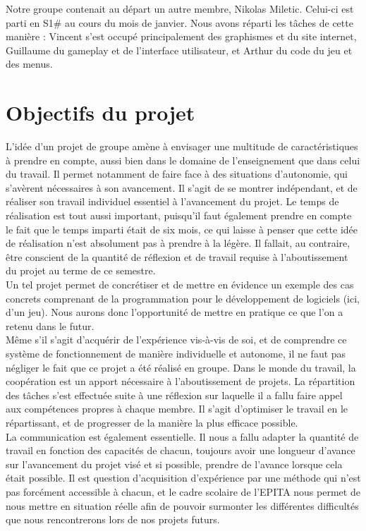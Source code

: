 \documentclass[12pt, titlepage]{article}
\begin{document}
\begin{spacing}{1.5}
Notre groupe contenait au départ un autre membre, Nikolas Miletic. Celui-ci est parti en S1\# au cours du mois de janvier. Nous avons réparti les tâches de cette manière : Vincent s'est occupé principalement des graphismes et du site internet, Guillaume du gameplay et de l’interface utilisateur, et Arthur du code du jeu et des menus.\\

\newpage
\section{Objectifs du projet}

L'idée d'un projet de groupe amène à envisager une multitude de caractéristiques à prendre en compte, aussi bien dans le domaine de l'enseignement que dans celui du travail. Il permet notamment de faire face à des situations d'autonomie, qui s'avèrent nécessaires à son avancement. Il s'agit de se montrer indépendant, et de réaliser son travail individuel essentiel à l'avancement du projet. Le temps de réalisation est tout aussi important, puisqu'il faut également prendre en compte le fait que le temps imparti était de six mois, ce qui laisse à penser que cette idée de réalisation n'est absolument pas à prendre à la légère. Il fallait, au contraire, être conscient de la quantité de réflexion et de travail requise à l'aboutissement du projet au terme de ce semestre.\\

Un tel projet permet de concrétiser et de mettre en évidence un exemple des cas concrets comprenant de la programmation pour le développement de logiciels (ici, d’un jeu). Nous aurons donc l'opportunité de mettre en pratique ce que l’on a retenu dans le futur.\\

Même s'il s'agit d'acquérir de l'expérience vis-à-vis de soi, et de comprendre ce système de fonctionnement de manière individuelle et autonome, il ne faut pas négliger le fait que ce projet a été réalisé en groupe. Dans le monde du travail, la coopération est un apport nécessaire à l'aboutissement de projets. La répartition des tâches s’est effectuée suite à une réflexion sur laquelle il a fallu faire appel aux compétences propres à chaque membre. Il s'agit d'optimiser le travail en le répartissant, et de progresser de la manière la plus efficace possible.\\

La communication est également essentielle. Il nous a fallu adapter la quantité de travail en fonction des capacités de chacun, toujours avoir une longueur d'avance sur l'avancement du projet visé et si possible, prendre de l'avance lorsque cela était possible. Il est question d'acquisition d'expérience par une méthode qui n'est pas forcément accessible à chacun, et le cadre scolaire de l'EPITA nous permet de nous mettre en situation réelle afin de pouvoir surmonter les différentes difficultés que nous rencontrerons lors de nos projets futurs.\\


\end{spacing}
\end{document}
